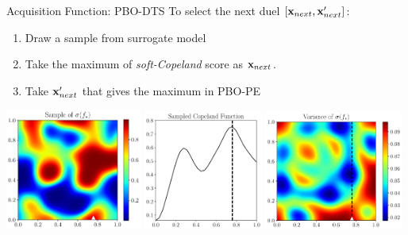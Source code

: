 \documentclass[13pt,aspectratio=1610]{beamer}
\begin{document}
\begin{frame}{Acquisition Function: PBO-DTS}
To select the next duel $[{\bf x}_{next}, {\bf x}_{next}']$:
\begin{enumerate}
\item Draw a sample from surrogate model
\item Take the maximum of \emph{soft-Copeland} score as ${\bf x}_{next}$.
\item Take ${\bf x}_{next}'$ that gives the maximum in PBO-PE
\end{enumerate}

\includegraphics[width=0.335\textwidth]{sample_f_star_cropped.pdf} 
\includegraphics[width=0.295\textwidth]{sample_copeland_cropped.pdf} 
\includegraphics[width=0.34\textwidth]{var_f_max_cropped.pdf} 

\end{frame}
\end{document}
